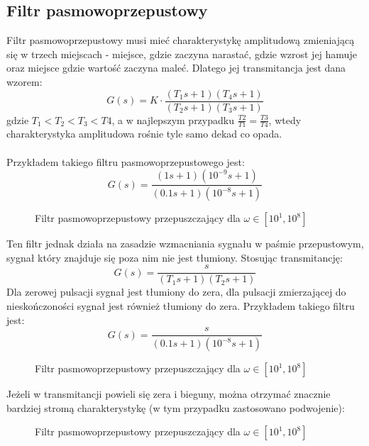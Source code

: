 \documentclass[a4paper, 10pt]{article}
\begin{document}
		\subsection{Filtr pasmowoprzepustowy}
			Filtr pasmowoprzepustowy musi mieć charakterystykę amplitudową zmieniającą się w trzech miejscach - miejsce, gdzie zaczyna narastać, gdzie wzrost jej hamuje oraz miejsce gdzie wartość zaczyna maleć. Dlatego jej transmitancja jest dana wzorem:
			$$
				G(s) = K\cdot\frac{(T_1 s + 1)(T_4 s + 1)}{(T_2 s + 1)(T_3 s + 1)}
			$$
			gdzie $T_1 < T_2 < T_3 < T4$, a w najlepszym przypadku $\frac{T2}{T1} = \frac{T3}{T4}$, wtedy charakterystyka amplitudowa rośnie tyle samo dekad co opada.
			\\ \\
			Przykładem takiego filtru pasmowoprzepustowego jest:
			$$
				G(s) = \frac{(1 s + 1)(10^{-9} s + 1)}{(0.1 s + 1)(10^{-8} s + 1)}
			$$
			\begin{figure}[H]
				\centering
				\def \svgwidth{0.7\columnwidth}
				
				\caption{Filtr pasmowoprzepustowy przepuszczający dla $\omega \in [10^1, 10^8]$}
			\end{figure}\noindent
			Ten filtr jednak działa na zasadzie wzmacniania sygnału w paśmie przepustowym, sygnał który znajduje się poza nim nie jest tłumiony. Stosując transmitancję:
			$$
				G(s) = \frac{s}{(T_1 s + 1)(T_2 s + 1)}
			$$
			Dla zerowej pulsacji sygnał jest tłumiony do zera, dla pulsacji zmierzającej do nieskończoności sygnał jest również tłumiony do zera. Przykładem takiego filtru jest:
			$$
				G(s) = \frac{s}{(0.1 s + 1)(10^{-8} s + 1)}
			$$
			\begin{figure}[H]
				\centering
				\def \svgwidth{0.7\columnwidth}
				
				\caption{Filtr pasmowoprzepustowy przepuszczający dla $\omega \in [10^1, 10^8]$}
			\end{figure}\noindent
			Jeżeli w transmitancji powieli się zera i bieguny, można otrzymać znacznie bardziej stromą charakterystykę (w tym przypadku zastosowano podwojenie):
			\begin{figure}[H]
				\centering
				\def \svgwidth{0.7\columnwidth}
				
				\caption{Filtr pasmowoprzepustowy przepuszczający dla $\omega \in [10^1, 10^8]$}
			\end{figure}\noindent
\end{document}
